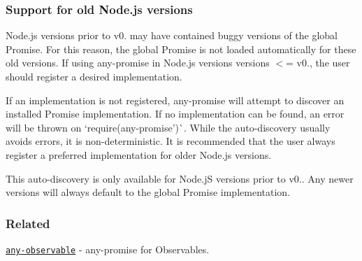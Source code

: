 \subsubsection*{Support for old Node.\+js versions}

Node.\+js versions prior to {\ttfamily v0.} may have contained buggy versions of the global {\ttfamily Promise}. For this reason, the global {\ttfamily Promise} is not loaded automatically for these old versions. If using {\ttfamily any-\/promise} in Node.\+js versions versions {\ttfamily $<$= v0.}, the user should register a desired implementation.

If an implementation is not registered, {\ttfamily any-\/promise} will attempt to discover an installed {\ttfamily Promise} implementation. If no implementation can be found, an error will be thrown on `require(\textquotesingle{}any-\/promise')\`{}. While the auto-\/discovery usually avoids errors, it is non-\/deterministic. It is recommended that the user always register a preferred implementation for older Node.\+js versions.

This auto-\/discovery is only available for Node.\+jS versions prior to {\ttfamily v0.}. Any newer versions will always default to the global {\ttfamily Promise} implementation.

\subsubsection*{Related}


\begin{DoxyItemize}
\item \href{https://github.com/sindresorhus/any-observable}{\tt any-\/observable} -\/ {\ttfamily any-\/promise} for Observables. 
\end{DoxyItemize}